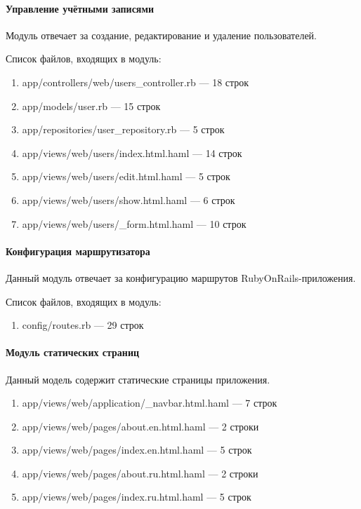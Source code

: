 \paragraph{Управление учётными записями}

Модуль отвечает за создание, редактирование и удаление пользователей.

Список файлов, входящих в модуль:
\begin{enumerate}[label=\arabic*)]
\item app/controllers/web/users\_controller.rb --- 18 строк
\item app/models/user.rb --- 15 строк
\item app/repositories/user\_repository.rb --- 5 строк
\item app/views/web/users/index.html.haml --- 14 строк
\item app/views/web/users/edit.html.haml --- 5 строк
\item app/views/web/users/show.html.haml --- 6 строк
\item app/views/web/users/\_form.html.haml --- 10 строк
\end{enumerate}


\paragraph{Конфигурация маршрутизатора}

Данный модуль отвечает за конфигурацию маршрутов RubyOnRails-приложения.

Список файлов, входящих в модуль:
\begin{enumerate}[label=\arabic*)]
\item config/routes.rb --- 29 строк
\end{enumerate}


\paragraph{Модуль статических страниц}

Данный модель содержит статические страницы приложения.

\begin{enumerate}[label=\arabic*)]
\item app/views/web/application/\_navbar.html.haml --- 7 строк
\item app/views/web/pages/about.en.html.haml --- 2 строки
\item app/views/web/pages/index.en.html.haml --- 5 строк
\item app/views/web/pages/about.ru.html.haml --- 2 строки
\item app/views/web/pages/index.ru.html.haml --- 5 строк
\end{enumerate}


